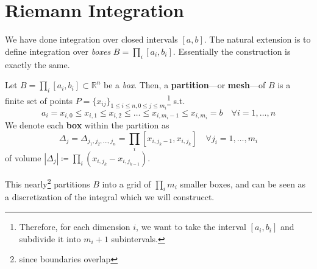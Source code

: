 \section{Riemann Integration} 

  We have done integration over closed intervals $[a, b]$. The natural extension is to define integration over \textit{boxes} $B = \prod_i [a_i, b_i]$. Essentially the construction is exactly the same. 

  \begin{definition}
    Let $B = \prod_i [a_i, b_i] \subset \mathbb{R}^n$ be a \textit{box}. Then, a \textbf{partition}---or \textbf{mesh}---of $B$ is a finite set of points $P = \{x_{ij}\}_{1 \leq i \leq n, 0 \leq j \leq m_i}$\footnote{Therefore, for each dimension $i$, we want to take the interval $[a_i, b_i]$ and subdivide it into $m_i+1$ subintervals.} s.t. 
    \begin{equation}
      a_i = x_{i, 0} \leq x_{i, 1} \leq x_{i, 2} \leq \ldots \leq x_{i, m_i-1} \leq x_{i, m_i} = b \quad \forall i = 1, \ldots, n
    \end{equation}
    We denote each \textbf{box} within the partition as 
    \begin{equation}
      \Delta_j = \Delta_{j_1, j_2, \ldots, j_n} = \prod_{i} [x_{i, j_k-1}, x_{i, j_k}] \quad \forall j_i = 1, \ldots, m_i
    \end{equation}
    of volume $|\Delta_j| \coloneqq \prod_{i} (x_{i, j_k} - x_{i, j_{k-1}})$. 
  \end{definition}

  This nearly\footnote{since boundaries overlap} partitions $B$ into a grid of $\prod_i m_i$ smaller boxes, and can be seen as a discretization of the integral which we will construcct. 

